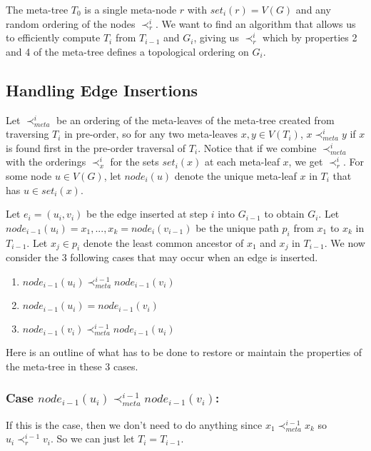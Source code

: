 \documentclass{article}
\begin{document}
The meta-tree $T_{0}$ is a single meta-node $r$ with $set_{i}(r)=V(G)$ and any random ordering of the nodes $\prec_{r}^{i}$. We want to find an algorithm that allows us to efficiently compute $T_{i}$ from $T_{i-1}$ and $G_{i}$, giving us $\prec_{r}^{i}$ which by properties 2 and 4 of the meta-tree defines a topological ordering on $G_{i}$.

\subsection{Handling Edge Insertions}

Let $\prec_{meta}^{i}$ be an ordering of the meta-leaves of the meta-tree created from traversing $T_{i}$ in pre-order, so for any two meta-leaves $x,y \in V(T_{i})$, $x \prec_{meta}^{i} y$ if $x$ is found first in the pre-order traversal of $T_{i}$. Notice that if we combine $\prec_{meta}^{i}$ with the orderings $\prec_{x}^{i}$ for the sets $set_{i}(x)$ at each meta-leaf $x$, we get $\prec_{r}^{i}$. For some node $u \in V(G)$, let $node_{i}(u)$ denote the unique meta-leaf $x$ in $T_{i}$ that has $u \in set_{i}(x)$.

Let $e_{i}=(u_{i},v_{i})$ be the edge inserted at step $i$ into $G_{i-1}$ to obtain $G_{i}$. Let $node_{i-1}(u_{i})=x_{1},...,x_{k}=node_{i}(v_{i-1})$ be the unique path $p_{i}$ from $x_{1}$ to $x_{k}$ in $T_{i-1}$. Let $x_{j}\in p_{i}$ denote the least common ancestor of $x_{1}$ and $x_{j}$ in $T_{i-1}$. We now consider the 3 following cases that may occur when an edge is inserted.

\begin{enumerate}
\item $node_{i-1}(u_{i}) \prec_{meta}^{i-1} node_{i-1}(v_{i})$
\item $node_{i-1}(u_{i}) = node_{i-1}(v_{i})$
\item $node_{i-1}(v_{i}) \prec_{meta}^{i-1} node_{i-1}(u_{i})$ 
\end{enumerate}

Here is an outline of what has to be done to restore or maintain the properties of the meta-tree in these 3 cases.

\subsubsection{Case $node_{i-1}(u_{i}) \prec_{meta}^{i-1} node_{i-1}(v_{i})$:}

If this is the case, then we don't need to do anything since $x_{1} \prec_{meta}^{i-1} x_{k}$ so $u_{i} \prec_{r}^{i-1} v_{i}$. So we can just let $T_{i}=T_{i-1}$.
\end{document}

